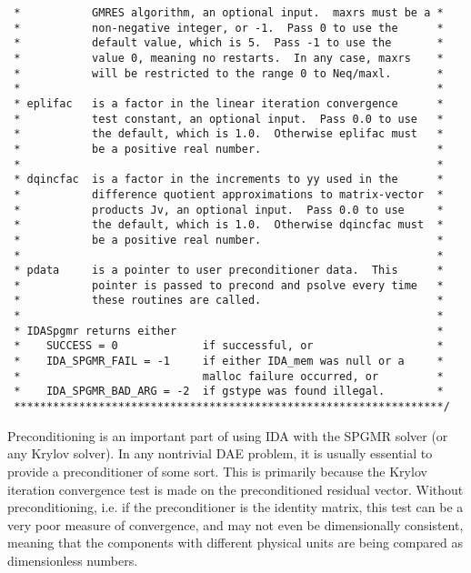 \documentclass[11pt]{article}
\begin{document}
\begin{verbatim}
 *           GMRES algorithm, an optional input.  maxrs must be a *
 *           non-negative integer, or -1.  Pass 0 to use the      *
 *           default value, which is 5.  Pass -1 to use the       *
 *           value 0, meaning no restarts.  In any case, maxrs    *
 *           will be restricted to the range 0 to Neq/maxl.       *
 *                                                                *
 * eplifac   is a factor in the linear iteration convergence      *
 *           test constant, an optional input.  Pass 0.0 to use   *
 *           the default, which is 1.0.  Otherwise eplifac must   *
 *           be a positive real number.                           *
 *                                                                *
 * dqincfac  is a factor in the increments to yy used in the      *
 *           difference quotient approximations to matrix-vector  *
 *           products Jv, an optional input.  Pass 0.0 to use     *
 *           the default, which is 1.0.  Otherwise dqincfac must  *
 *           be a positive real number.                           *
 *                                                                *
 * pdata     is a pointer to user preconditioner data.  This      *
 *           pointer is passed to precond and psolve every time   *
 *           these routines are called.                           *
 *                                                                *
 * IDASpgmr returns either                                        *
 *    SUCCESS = 0             if successful, or                   *
 *    IDA_SPGMR_FAIL = -1     if either IDA_mem was null or a     *
 *                            malloc failure occurred, or         *
 *    IDA_SPGMR_BAD_ARG = -2  if gstype was found illegal.        *
 ******************************************************************/

\end{verbatim}
\normalsize

Preconditioning is an important part of using IDA with the SPGMR
solver (or any Krylov solver).  In any nontrivial DAE problem, it is
usually essential to provide a preconditioner of some sort.  This is
primarily because the Krylov iteration convergence test is made on the
preconditioned residual vector.  Without preconditioning, i.e. if the
preconditioner is the identity matrix, this test can be a very poor
measure of convergence, and may not even be dimensionally consistent,
meaning that the components with different physical units are being
compared as dimensionless numbers.
\end{document}
